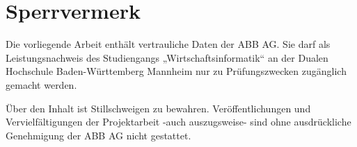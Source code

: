 \chapter*{Sperrvermerk}
Die vorliegende Arbeit enthält vertrauliche Daten der ABB AG. Sie darf als Leistungsnachweis des Studiengangs „Wirtschaftsinformatik“ an der Dualen Hochschule Baden-Württemberg Mannheim nur zu Prüfungszwecken zugänglich gemacht werden. 

Über den Inhalt ist Stillschweigen zu bewahren. Veröffentlichungen und Vervielfältigungen der Projektarbeit -auch auszugsweise- sind ohne ausdrückliche Genehmigung der ABB AG nicht gestattet.   
\cleardoublepage
